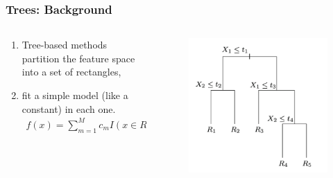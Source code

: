 \documentclass[
  shownotes,
  xcolor={svgnames},
  hyperref={colorlinks,citecolor=DarkBlue,linkcolor=DarkRed,urlcolor=DarkBlue}
  , aspectratio=169]{beamer}
\begin{document}
\begin{frame}[fragile]
\frametitle{Trees: Background}


\begin{columns}[T] %
\begin{column}{.42\textwidth}
  
\begin{enumerate}
\item Tree-based methods partition the feature space into a set of rectangles,
\item  fit a simple model (like a constant) in each one. 
\begin{align}
f(x) = \sum_{m=1}^M c_m I(x\in R_m)
\end{align}
\end{enumerate}


\end{column}  
\hfill
\begin{column}{.48\textwidth}

 \begin{figure}[H] \centering
            \captionsetup{justification=centering}
              \includegraphics[scale=0.6]{figures/cart_tree}                           
 \end{figure}

\end{column}
\end{columns}


\end{frame}
\end{document}
